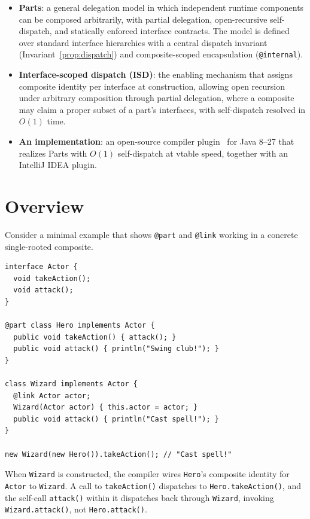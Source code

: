 \documentclass[acmsmall,screen,review,anonymous]{acmart}
\theoremstyle{acmplain}
\newcommand{\code}[1]{\texttt{#1}}
\begin{document}
\begin{itemize}
  \item \textbf{Parts}: a general delegation model in which independent runtime
        components can be composed arbitrarily, with partial delegation,
        open-recursive self-dispatch, and statically enforced interface contracts.
        The model is defined over standard interface hierarchies with a central
        dispatch invariant (Invariant~\ref{prop:dispatch}) and composite-scoped
        encapsulation (\code{@internal}).

  \item \textbf{Interface-scoped dispatch (ISD)}: the enabling mechanism that
        assigns composite identity per interface at construction, allowing
        open recursion under arbitrary composition through partial delegation,
        where a composite may claim a proper subset of a part's interfaces,
        with self-dispatch resolved in $O(1)$ time.

  \item \textbf{An implementation}: an open-source compiler plugin~\cite{mckinney2026}
        for Java 8--27 that realizes Parts with $O(1)$ self-dispatch at vtable speed,
        together with an IntelliJ IDEA plugin.
\end{itemize}

\section{Overview}

Consider a minimal example that shows \code{@part} and \code{@link} working in a concrete single-rooted composite.

\begin{lstlisting}
interface Actor {
  void takeAction();
  void attack();
}

@part class Hero implements Actor {
  public void takeAction() { attack(); }
  public void attack() { println("Swing club!"); }
}

class Wizard implements Actor {
  @link Actor actor;
  Wizard(Actor actor) { this.actor = actor; }
  public void attack() { println("Cast spell!"); }
}

new Wizard(new Hero()).takeAction(); // "Cast spell!"
\end{lstlisting}

When \code{Wizard} is constructed, the compiler wires \code{Hero}'s
composite identity for \code{Actor} to \code{Wizard}. A call to
\code{takeAction()} dispatches to \code{Hero.takeAction()}, and the self-call
\code{attack()} within it dispatches back through \code{Wizard}, invoking
\code{Wizard.attack()}, not \code{Hero.attack()}.
\end{document}
